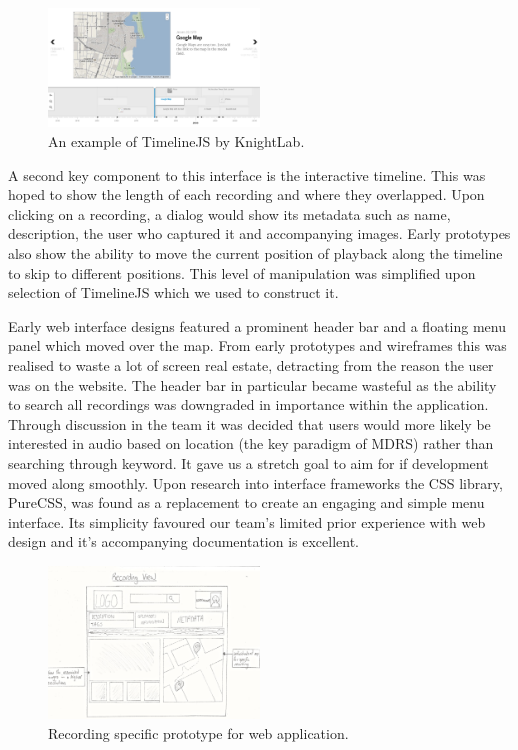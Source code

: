 \documentclass{l3proj}
\begin{document}
\begin{figure}[ht!]
\centering
\includegraphics[width=0.5\textwidth]{images/timeline-example.png}
\caption{An example of TimelineJS by KnightLab.}
\end{figure}

A second key component to this interface is the interactive timeline. This was hoped to show the length of each recording and where they overlapped. Upon clicking on a recording, a dialog would show its metadata such as name, description, the user who captured it and accompanying images. Early prototypes also show the ability to move the current position of playback along the timeline to skip to different positions. This level of manipulation was simplified upon selection of TimelineJS which we used to construct it.

Early web interface designs featured a prominent header bar and a floating menu panel which moved over the map. From early prototypes and wireframes this was realised to waste a lot of screen real estate, detracting from the reason the user was on the website. The header bar in particular became wasteful as the ability to search all recordings was downgraded in importance within the application. Through discussion in the team it was decided that users would more likely be interested in audio based on location (the key paradigm of MDRS) rather than searching through keyword. It gave us a stretch goal to aim for if development moved along smoothly. Upon research into interface frameworks the CSS library, PureCSS, was found as a replacement to create an engaging and simple menu interface. Its simplicity favoured our team's limited prior experience with web design and it’s accompanying documentation is excellent.

\begin{figure}[ht!]
\centering
\includegraphics[width=0.5\textwidth]{images/web-recording-view.jpg}
\caption{Recording specific prototype for web application.}
\end{figure}
\end{document}

